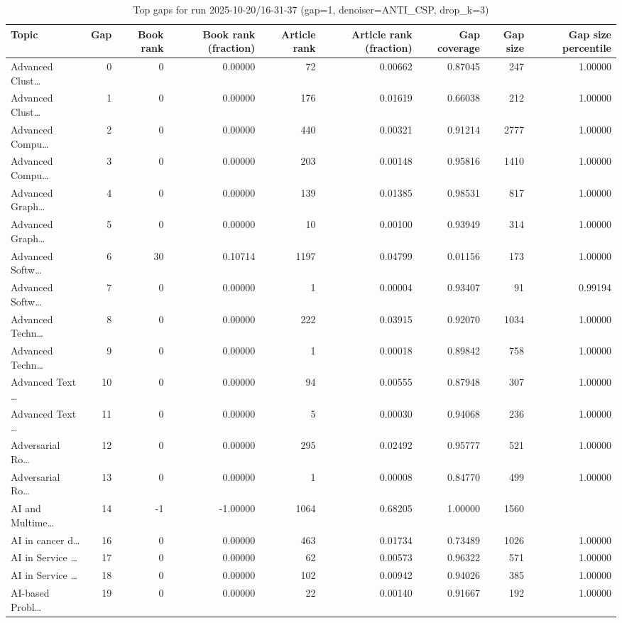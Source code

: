 \begin{table}
\caption{Top gaps for run 2025-10-20/16-31-37 (gap=1, denoiser=ANTI\_CSP, drop\_k=3)}
\label{tab:best_run_gap1_2025_10_20_16_31_37}
\begin{tabular}{lrrrrrrrr}
\toprule
Topic & Gap & Book rank & Book rank (fraction) & Article rank & Article rank (fraction) & Gap coverage & Gap size & Gap size percentile \\
\midrule
Advanced Clust… & 0 & 0 & 0.00000 & 72 & 0.00662 & 0.87045 & 247 & 1.00000 \\
Advanced Clust… & 1 & 0 & 0.00000 & 176 & 0.01619 & 0.66038 & 212 & 1.00000 \\
Advanced Compu… & 2 & 0 & 0.00000 & 440 & 0.00321 & 0.91214 & 2777 & 1.00000 \\
Advanced Compu… & 3 & 0 & 0.00000 & 203 & 0.00148 & 0.95816 & 1410 & 1.00000 \\
Advanced Graph… & 4 & 0 & 0.00000 & 139 & 0.01385 & 0.98531 & 817 & 1.00000 \\
Advanced Graph… & 5 & 0 & 0.00000 & 10 & 0.00100 & 0.93949 & 314 & 1.00000 \\
Advanced Softw… & 6 & 30 & 0.10714 & 1197 & 0.04799 & 0.01156 & 173 & 1.00000 \\
Advanced Softw… & 7 & 0 & 0.00000 & 1 & 0.00004 & 0.93407 & 91 & 0.99194 \\
Advanced Techn… & 8 & 0 & 0.00000 & 222 & 0.03915 & 0.92070 & 1034 & 1.00000 \\
Advanced Techn… & 9 & 0 & 0.00000 & 1 & 0.00018 & 0.89842 & 758 & 1.00000 \\
Advanced Text … & 10 & 0 & 0.00000 & 94 & 0.00555 & 0.87948 & 307 & 1.00000 \\
Advanced Text … & 11 & 0 & 0.00000 & 5 & 0.00030 & 0.94068 & 236 & 1.00000 \\
Adversarial Ro… & 12 & 0 & 0.00000 & 295 & 0.02492 & 0.95777 & 521 & 1.00000 \\
Adversarial Ro… & 13 & 0 & 0.00000 & 1 & 0.00008 & 0.84770 & 499 & 1.00000 \\
AI and Multime… & 14 & -1 & -1.00000 & 1064 & 0.68205 & 1.00000 & 1560 &  \\
AI in cancer d… & 16 & 0 & 0.00000 & 463 & 0.01734 & 0.73489 & 1026 & 1.00000 \\
AI in Service … & 17 & 0 & 0.00000 & 62 & 0.00573 & 0.96322 & 571 & 1.00000 \\
AI in Service … & 18 & 0 & 0.00000 & 102 & 0.00942 & 0.94026 & 385 & 1.00000 \\
AI-based Probl… & 19 & 0 & 0.00000 & 22 & 0.00140 & 0.91667 & 192 & 1.00000 \\

\end{tabular}
\end{table}
